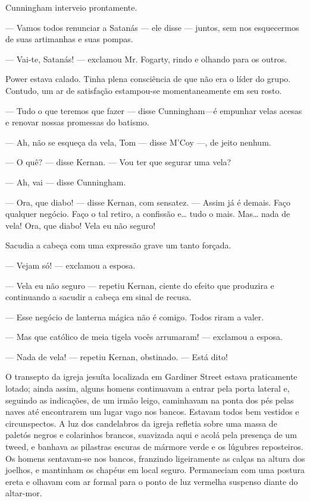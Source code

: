 Cunningham interveio prontamente.

--- Vamos todos renunciar a Satanás --- ele disse --- juntos, sem nos
esquecermos de suas artimanhas e suas pompas.

--- Vai-te, Satanás! --- exclamou Mr. Fogarty, rindo e olhando para os
outros.

Power estava calado. Tinha plena consciência de que não era o líder do
grupo. Contudo, um ar de satisfação estampou-se momentaneamente em seu
rosto.

--- Tudo o que teremos que fazer --- disse Cunningham---é empunhar
velas acesas e renovar nossas promessas do batismo.

--- Ah, não se esqueça da vela, Tom --- disse M'Coy ---, de jeito
nenhum.

--- O quê? --- disse Kernan. --- Vou ter que segurar uma vela?

--- Ah, vai --- disse Cunningham.

--- Ora, que diabo! --- disse Kernan, com sensatez. --- Assim já é
demais. Faço qualquer negócio. Faço o tal retiro, a confissão e\ldots{}
tudo o mais. Mas\ldots{} nada de vela! Ora, que diabo! Vela eu não seguro!

Sacudia a cabeça com uma expressão grave um tanto forçada.

--- Vejam só! --- exclamou a esposa.

--- Vela eu não seguro --- repetiu Kernan, ciente do efeito que
produzira e continuando a sacudir a cabeça em sinal de recusa.

--- Esse negócio de lanterna mágica não é comigo. Todos riram a
valer.

--- Mas que católico de meia tigela vocês arrumaram! --- exclamou a
esposa.

--- Nada de vela! --- repetiu Kernan, obstinado. --- Está dito!

O transepto da igreja jesuíta localizada em Gardiner Street estava
praticamente lotado; ainda assim, alguns homens continuavam a entrar
pela porta lateral e, seguindo as indicações, de um irmão leigo,
caminhavam na ponta dos pés pelas naves até encontrarem um lugar
vago nos bancos. Estavam todos bem vestidos e circunspectos. A luz
dos candelabros da igreja refletia sobre uma massa de paletós negros e
colarinhos brancos, suavizada aqui e acolá pela presença de um
tweed, e banhava as pilastras escuras de mármore verde e os lúgubres
reposteiros. Os homens sentavam-se nos bancos, franzindo ligeiramente
as calças na altura dos joelhos, e mantinham os chapéus em local
seguro. Permaneciam com uma postura ereta e olhavam com ar formal
para o ponto de luz vermelha suspenso diante do altar-mor.

